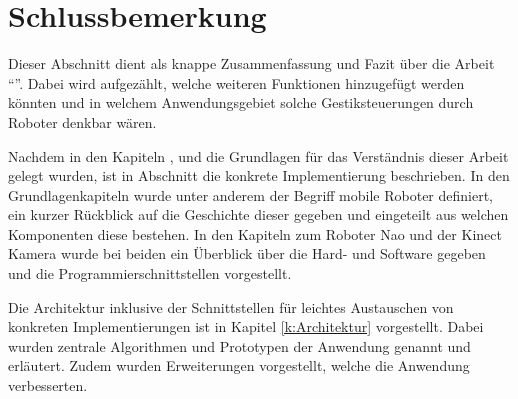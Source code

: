 \chapter{Schlussbemerkung}
Dieser Abschnitt dient als knappe Zusammenfassung und Fazit über die Arbeit "`\Titel"'. Dabei wird aufgezählt, welche weiteren Funktionen hinzugefügt werden könnten und in welchem Anwendungsgebiet solche Gestiksteuerungen durch Roboter denkbar wären.

Nachdem in den Kapiteln ,  und  die Grundlagen für das Verständnis dieser Arbeit gelegt wurden, ist in Abschnitt  die konkrete Implementierung beschrieben. In den Grundlagenkapiteln wurde unter anderem der Begriff mobile Roboter definiert, ein kurzer Rückblick auf die Geschichte dieser gegeben und eingeteilt aus welchen Komponenten diese bestehen. In den Kapiteln zum Roboter Nao und der Kinect Kamera wurde bei beiden ein Überblick über die Hard- und Software gegeben und die Programmierschnittstellen vorgestellt.

Die Architektur inklusive der Schnittstellen für leichtes Austauschen von konkreten Implementierungen ist in Kapitel \ref{k:Architektur} vorgestellt. Dabei wurden zentrale Algorithmen und Prototypen der Anwendung genannt und erläutert. Zudem wurden Erweiterungen vorgestellt, welche die Anwendung verbesserten.


